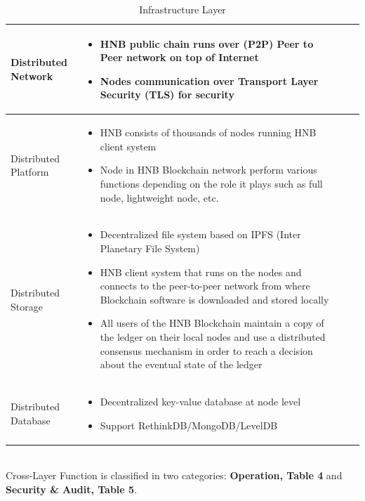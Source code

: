 \documentclass[fleqn,10pt]{SelfArx} %
\begin{document}
\begin{table}[!hbpt]
\caption{Infrastructure Layer}
\centering
\begin{tabular}{lp{13cm}p{10cm}r}
\toprule
Distributed Network
 & 
\begin{itemize}
\item{HNB public chain runs over (P2P) Peer to Peer network on top of Internet}
\item{Nodes communication over Transport Layer Security (TLS) for security}
\end{itemize}\\
\midrule
Distributed Platform
 & 
\begin{itemize}
\item{HNB consists of thousands of nodes running HNB client system}
\item{Node in HNB Blockchain network perform various functions depending on the role it plays such as full node, lightweight node, etc.}
\end{itemize}\\
\midrule
Distributed Storage & 
\begin{itemize}
\item{Decentralized file system based on IPFS (Inter Planetary File System)}
\item{HNB client system that runs on the nodes and connects to the peer-to-peer network from where Blockchain software is downloaded and stored locally}
\item{All users of the HNB Blockchain maintain a copy of the ledger on their local nodes and use a distributed consensus mechanism in order to reach a decision about the eventual state of the ledger}
\end{itemize}
\\
\midrule
Distributed Database
 & 
\begin{itemize}
\item{Decentralized key-value database at node level}
\item{Support RethinkDB/MongoDB/LevelDB}
\end{itemize}
\\
\bottomrule
\end{tabular}
\label{tab:label}
\end{table}

\\
Cross-Layer Function is classified in two categories: \textbf {Operation, Table 4} and \textbf {Security \& Audit, Table 5}.
\end{document}
